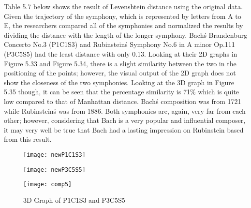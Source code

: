 Table 5.7 below shows the result of Levenshtein distance using the original data. Given the trajectory of the symphony, which is represented by letters from A to E, the researchers compared all of the symphonies and normalized the results by dividing the distance with the length of the longer symphony. Bach\'s Brandenburg Concerto No.3 (P1C1S3) and Rubinstein\'s Symphony No.6 in A minor Op.111 (P3C5S5) had the least distance with only 0.13. Looking at their 2D graphs in Figure 5.33 and Figure 5.34, there is a slight similarity between the two in the positioning of the points; however, the visual output of the 2D graph does not show the closeness of the two symphonies. Looking at the 3D graph in Figure 5.35 though, it can be seen that 
the percentage similarity is 71\% which is quite low compared to that of Manhattan distance. Bach\'s composition was from 1721 while Rubinstein\'s was from 1886. Both symphonies are, again, very far from each other; however, considering that Bach is a very popular and influential composer, it may very well be true that Bach had a lasting impression on Rubinstein based from this result.

\begin{figure}[H]
\begin{minipage}{.5\textwidth}
  \centering
  \texttt{[image: newP1C1S3]}
  \label{fig:test1}
\end{minipage}
\begin{minipage}{.5\textwidth}
  \centering
  \texttt{[image: newP3C5S5]}
  \label{fig:test2}
\end{minipage}
\end{figure}

\begin{figure}[H]
\caption{3D Graph of P1C1S3 and P3C5S5}
\centering
\texttt{[image: comp5]}
\end{figure}


